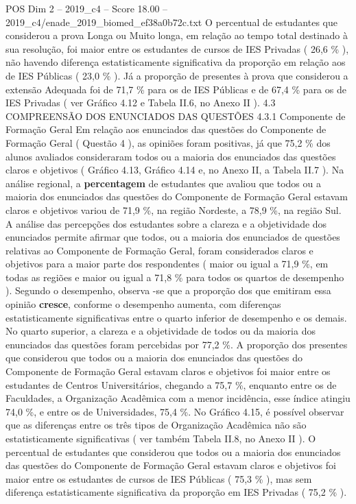 \begin{textsample}{POS Dim 2 – 2019\_c4 – Score 18.00 – 2019\_c4/enade\_2019\_biomed\_ef38a0b72c.txt}
O percentual de estudantes que considerou a prova Longa ou Muito longa, em relação ao tempo total destinado à sua resolução, foi maior entre os estudantes de cursos de IES Privadas ( 26,6 \% ), não havendo diferença estatisticamente significativa da proporção em relação aos de IES Públicas ( 23,0 \% ).
Já a proporção de presentes à prova que considerou a extensão Adequada foi de 71,7 \% para os de IES Públicas e de 67,4 \% para os de IES Privadas ( ver Gráfico 4.12 e Tabela II.6, no Anexo II ). 4.3 COMPREENSÃO DOS ENUNCIADOS DAS QUESTÕES 4.3.1 Componente de Formação Geral Em relação aos enunciados das questões do Componente de Formação Geral ( Questão 4 ), as opiniões foram positivas, já que 75,2 \% dos alunos avaliados consideraram todos ou a maioria dos enunciados das questões claros e objetivos ( Gráfico 4.13, Gráfico 4.14 e, no Anexo II, a Tabela II.7 ).
Na análise regional, a \textbf{percentagem} de estudantes que avaliou que todos ou a maioria dos enunciados das questões do Componente de Formação Geral estavam claros e objetivos variou de 71,9 \%, na região Nordeste, a 78,9 \%, na região Sul.
A análise das percepções dos estudantes sobre a clareza e a objetividade dos enunciados permite afirmar que todos, ou a maioria dos enunciados de questões relativas ao Componente de Formação Geral, foram considerados claros e objetivos para a maior parte dos respondentes ( maior ou igual a 71,9 \%, em todas as regiões e maior ou igual a 71,8 \% para todos os quartos de desempenho ).
Segundo o desempenho, observa -se que a proporção dos que emitiram essa opinião \textbf{cresce}, conforme o desempenho aumenta, com diferenças estatisticamente significativas entre o quarto inferior de desempenho e os demais.
No quarto superior, a clareza e a objetividade de todos ou da maioria dos enunciados das questões foram percebidas por 77,2 \%.
A proporção dos presentes que considerou que todos ou a maioria dos enunciados das questões do Componente de Formação Geral estavam claros e objetivos foi maior entre os estudantes de Centros Universitários, chegando a 75,7 \%, enquanto entre os de Faculdades, a Organização Acadêmica com a menor incidência, esse índice atingiu 74,0 \%, e entre os de Universidades, 75,4 \%.
No Gráfico 4.15, é possível observar que as diferenças entre os três tipos de Organização Acadêmica não são estatisticamente significativas ( ver também Tabela II.8, no Anexo II ).
O percentual de estudantes que considerou que todos ou a maioria dos enunciados das questões do Componente de Formação Geral estavam claros e objetivos foi maior entre os estudantes de cursos de IES Públicas ( 75,3 \% ), mas sem diferença estatisticamente significativa da proporção em IES Privadas ( 75,2 \% ).

\end{textsample}
